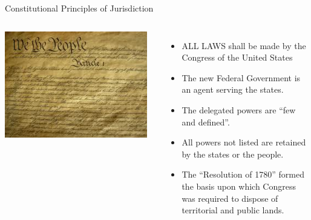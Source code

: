 \begin{frame}{Constitutional Principles of Jurisdiction}
    \begin{columns}[onlytextwidth]
            \centering
            \includegraphics[width=0.95\textwidth]{img/constitution.png} \\

            \begin{itemize}
                \item ALL LAWS shall be made by the Congress of the United States
                \item The new Federal Government is an agent serving the states.
                \item The delegated powers are “few and defined”. 
                \item All powers not listed are retained by the states or the people.
                \item The “Resolution of 1780”  formed the basis upon which Congress was required to dispose of territorial and public lands.
            \end{itemize}
    \end{columns}
\end{frame}


